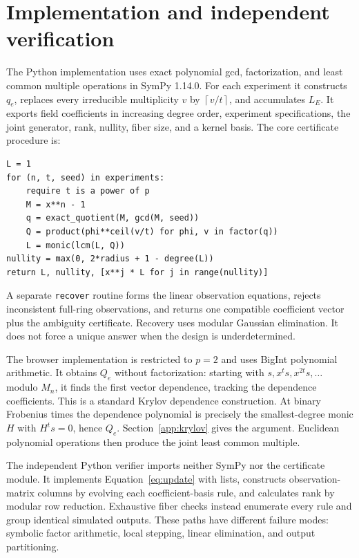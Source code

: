 \documentclass{ijuc}
\newcommand{\ceil}[1]{\left\lceil #1\right\rceil}
\begin{document}
\section{Implementation and independent verification}
The Python implementation uses exact polynomial gcd, factorization, and least common multiple operations in SymPy 1.14.0. For each experiment it constructs $q_e$, replaces every irreducible multiplicity $v$ by $\ceil{v/t}$, and accumulates $L_E$. It exports field coefficients in increasing degree order, experiment specifications, the joint generator, rank, nullity, fiber size, and a kernel basis. The core certificate procedure is:
\begin{lstlisting}[float=htbp,caption={Certificate construction; all polynomial operations are over the declared prime field.}]
L = 1
for (n, t, seed) in experiments:
    require t is a power of p
    M = x**n - 1
    q = exact_quotient(M, gcd(M, seed))
    Q = product(phi**ceil(v/t) for phi, v in factor(q))
    L = monic(lcm(L, Q))
nullity = max(0, 2*radius + 1 - degree(L))
return L, nullity, [x**j * L for j in range(nullity)]
\end{lstlisting}

A separate \texttt{recover} routine forms the linear observation equations, rejects inconsistent full-ring observations, and returns one compatible coefficient vector plus the ambiguity certificate. Recovery uses modular Gaussian elimination. It does not force a unique answer when the design is underdetermined.

The browser implementation is restricted to $p=2$ and uses BigInt polynomial arithmetic. It obtains $Q_e$ without factorization: starting with $s,x^t s,x^{2t}s,\ldots$ modulo $M_n$, it finds the first vector dependence, tracking the dependence coefficients. This is a standard Krylov dependence construction. At binary Frobenius times the dependence polynomial is precisely the smallest-degree monic $H$ with $H^t s=0$, hence $Q_e$. Section~\ref{app:krylov} gives the argument. Euclidean polynomial operations then produce the joint least common multiple.

The independent Python verifier imports neither SymPy nor the certificate module. It implements Equation~\eqref{eq:update} with lists, constructs observation-matrix columns by evolving each coefficient-basis rule, and calculates rank by modular row reduction. Exhaustive fiber checks instead enumerate every rule and group identical simulated outputs. These paths have different failure modes: symbolic factor arithmetic, local stepping, linear elimination, and output partitioning.
\end{document}

